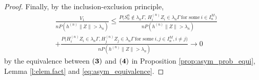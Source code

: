 \documentclass[11pt,reqno]{amsart}
\numberwithin{equation}{section}
\theoremstyle{definition}
\theoremstyle{remark}
\theoremstyle{definition}
\begin{document}
\begin{proof}
Finally, by the inclusion-exclusion principle, 
\begin{align*}
  & \frac{V_1}{nP(h^{(n)}\|Z\| > \lambda_n)} 
    \leq   \frac{ P\bigl(S_0^n \not \in \lambda_n\Gamma,  \, H_i^{(n)}Z_i\in \lambda_n \Gamma\ \text{for some} \ i\in I_n^M\bigr)}{nP(h^{(n)}\|Z\| > \lambda_n)} \\
    & + \frac{P\bigl( H_i^{(n)}Z_i\in \lambda_n \Gamma,  H_j^{(n)} Z_j \in
      \lambda_n \Gamma\ \text{for some} \ i,j\in I_n^M,
      i\not=j\bigr)}{nP(h^{(n)}\|Z\| > \lambda_n)}   \to 0
\end{align*}
by the equivalence between $({\bf 3})$ and $({\bf 4})$ in Proposition
\ref{prop:asym_prob_equi}, Lemma \ref{l:elem.fact} and
\eqref{eq:asym_equivalence}.  
\end{proof}
\end{document}
